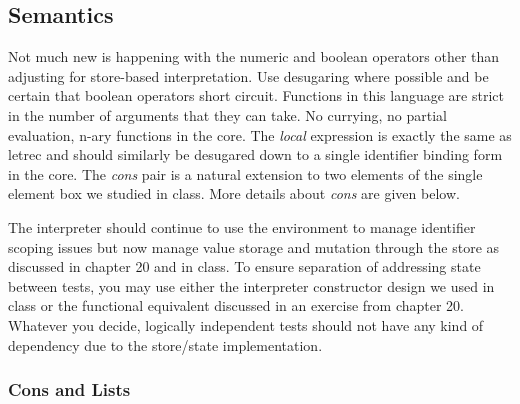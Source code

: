 \documentclass[10pt]{article}
\begin{document}
\subsection*{Semantics}

Not much new is happening with the numeric and boolean operators other than adjusting for store-based interpretation. Use desugaring where possible and be certain that boolean operators short circuit. Functions in this language are strict in the number of arguments that they can take. No currying, no partial evaluation, n-ary functions in the core. The \textit{local} expression is exactly the same as letrec and should similarly be desugared down to a single identifier binding form in the core. The \textit{cons} pair is a natural extension to two elements of the single element box we studied in class. More details about \textit{cons} are given below.

The interpreter should continue to use the environment to manage identifier scoping issues but now  manage value storage and mutation through the store as discussed in chapter 20 and in class. To ensure separation of addressing state between tests, you may use either the interpreter constructor design we used in class or the functional equivalent discussed in an exercise from chapter 20. Whatever you decide, logically independent tests should not have any kind of dependency due to the store/state implementation. 


\subsubsection*{Cons and Lists}
\end{document}
